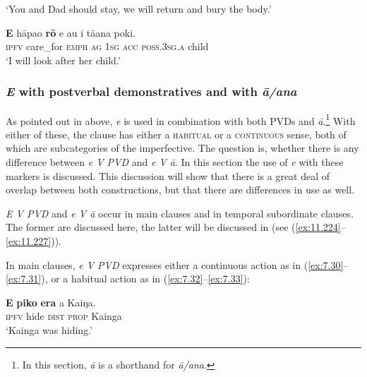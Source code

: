 \glt 
‘You and Dad should stay, we will return and bury the body.’ \textstyleExampleref{[Ley-4-08.017]}
\z

\ea\label{ex:7.29}
\gll \textbf{E} hāpa{\ꞌ}o \textbf{rō} e au i tā{\ꞌ}ana poki. \\
\textsc{ipfv} care\_for \textsc{emph} \textsc{ag} \textsc{1sg} \textsc{acc} \textsc{poss.3sg.a} child \\

\glt 
‘I will look after her child.’ \textstyleExampleref{[R229.081]} 
\z

\subsubsection{\textit{E} with postverbal demonstratives and with \textit{{\ꞌ}ā/{\ꞌ}ana}}\label{sec:7.2.5.4}
As pointed out in  above, \textit{e} is used in combination with both PVDs and \textit{{\ꞌ}ā}.\footnote{\label{fn:326}In this section, \textit{{\ꞌ}ā} is a shorthand for \textit{{\ꞌ}ā/{\ꞌ}ana}.} With either of these, the clause has either a \textsc{habitual} or a \textsc{continuous} sense, both of which are subcategories of the imperfective. The question is, whether there is any difference between \textit{e V PVD} and \textit{e V {\ꞌ}ā}. In this section the use of \textit{e} with these markers is discussed. This discussion will show that there is a great deal of overlap between both constructions, but that there are differences in use as well.

\textit{E V PVD} and \textit{e V {\ꞌ}ā} occur in main clauses and in temporal subordinate clauses. The former are discussed here, the latter will be discussed in  (see (\ref{ex:11.224}–\ref{ex:11.227})).

In main clauses, \textit{e V PVD} expresses either a continuous action as in (\ref{ex:7.30}–\ref{ex:7.31}), or a habitual action as in (\ref{ex:7.32}–\ref{ex:7.33}):

\ea\label{ex:7.30}
\gll \textbf{E} \textbf{piko} \textbf{era} a Kaiŋa. \\
\textsc{ipfv} hide \textsc{dist} \textsc{prop} Kainga \\

\glt 
‘Kainga was hiding.’ \textstyleExampleref{[R304.093]} 
\z

